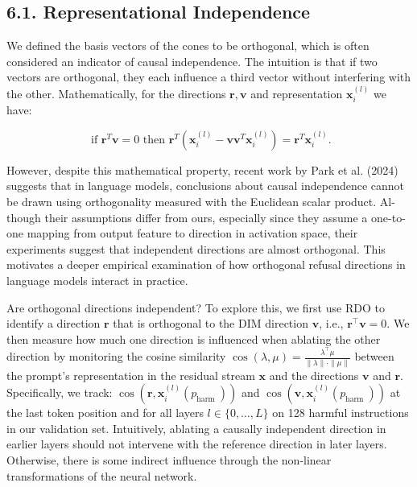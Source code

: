 \documentclass[10pt]{article}
\begin{document}
\subsection*{6.1. Representational Independence}
We defined the basis vectors of the cones to be orthogonal, which is often considered an indicator of causal independence. The intuition is that if two vectors are orthogonal, they each influence a third vector without interfering with the other. Mathematically, for the directions $\boldsymbol{r}, \boldsymbol{v}$ and representation $\boldsymbol{x}_{i}^{(l)}$ we have:

$$
\text { if } \boldsymbol{r}^{T} \boldsymbol{v}=0 \text { then } \boldsymbol{r}^{T}\left(\boldsymbol{x}_{i}^{(l)}-\boldsymbol{v} \boldsymbol{v}^{T} \boldsymbol{x}_{i}^{(l)}\right)=\boldsymbol{r}^{T} \boldsymbol{x}_{i}^{(l)} .
$$

However, despite this mathematical property, recent work by Park et al. (2024) suggests that in language models, conclusions about causal independence cannot be drawn using orthogonality measured with the Euclidean scalar product. Al-\\
though their assumptions differ from ours, especially since they assume a one-to-one mapping from output feature to direction in activation space, their experiments suggest that independent directions are almost orthogonal. This motivates a deeper empirical examination of how orthogonal refusal directions in language models interact in practice.

Are orthogonal directions independent? To explore this, we first use RDO to identify a direction $\boldsymbol{r}$ that is orthogonal to the DIM direction $\boldsymbol{v}$, i.e., $\boldsymbol{r}^{\top} \boldsymbol{v}=0$. We then measure how much one direction is influenced when ablating the other direction by monitoring the cosine similarity $\cos (\lambda, \mu)=\frac{\lambda^{\top} \mu}{\|\lambda\| \cdot\|\mu\|}$ between the prompt's representation in the residual stream $\boldsymbol{x}$ and the directions $\boldsymbol{v}$ and $\boldsymbol{r}$. Specifically, we track: $\cos \left(\boldsymbol{r}, \boldsymbol{x}_{i}^{(l)}\left(p_{\text {harm }}\right)\right)$ and $\cos \left(\boldsymbol{v}, \boldsymbol{x}_{i}^{(l)}\left(p_{\text {harm }}\right)\right)$ at the last token position and for all layers $l \in\{0, \ldots, L\}$ on 128 harmful instructions in our validation set. Intuitively, ablating a causally independent direction in earlier layers should not intervene with the reference direction in later layers. Otherwise, there is some indirect influence through the non-linear transformations of the neural network.
\end{document}
